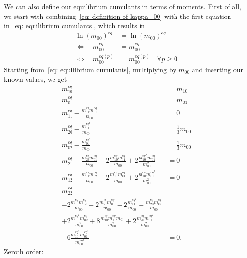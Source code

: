 We can also define our equilibrium cumulants in terms of moments.
First of all, we start with combining~\eqref{eq: definition of kappa_00} with the first equation in~\eqref{eq: equilibrium cumulants}, which results in
\begin{equation}
  \begin{aligned}
    {\ln(m_{00})}^{eq} &= {\ln(m_{00})}^{eq} \\
    \Leftrightarrow\quad m_{00}^{eq} &= m_{00}^{eq} \\
    \Leftrightarrow\quad m_{00}^{eq(p)} &= m_{00}^{eq(p)} \quad\forall p\ge 0
  \end{aligned}
\end{equation}
Starting from~\eqref{eq: equilibrium cumulants}, multiplying by $m_{00}$ and inserting our known values, we get
\begin{equation}
  \begin{aligned}
    m_{10}^{eq} & = m_{10} \\
    m_{01}^{eq} & = m_{01} \\
    m_{11}^{eq} - \frac{m_{10}^{eq}m_{01}^{eq}}{m_{00}} & = 0 \\
    m_{20}^{eq} - \frac{m_{10}^{{eq}^2}}{m_{00}} & = \frac{1}{3} m_{00} \\
    m_{02}^{eq} - \frac{m_{01}^{{eq}^2}}{m_{00}} & = \frac{1}{3} m_{00} \\
    m_{21}^{eq} - \frac{m_{20}^{eq}m_{01}^{eq}}{m_{00}} - 2\frac{m_{10}^{eq}m_{11}^{eq}} {m_{00}} + 2\frac{m_{10}^{{eq}^2} m_{01}^{eq}}{m_{00}^2} & = 0 \\
    m_{12}^{eq} - \frac{m_{10}^{eq}m_{02}^{eq}}{m_{00}}
    - 2\frac{m_{11}^{eq}m_{01}^{eq}}{m_{00}} + 2\frac{m_{10}^{eq} m_{01}^{{eq}^2}}{m_{00}^2} & = 0 \\
    m_{22}^{eq} &\\
    - 2 \frac{m_{10}^{eq}m_{12}^{eq}}{m_{00}} - 2\frac{m_{21}^{eq}m_{01}^{eq}}{m_{00}}
    - 2 \frac{m_{11}^{{eq}^2}}{m_{00}} - \frac{m_{20}^{eq}m_{02}^{eq}}{m_{00}} &\\
    + 2 \frac{m_{10}^{{eq}^2} m_{02}^{eq}}{m_{00}^2} + 8 \frac{m_{10}^{eq}m_{11}^{eq}m_{01}} {m_{00}^2}
    + 2 \frac{m_{20}^{eq}m_{01}^{{eq}^2}}{m_{00}^2} &\\
    - 6 \frac{m_{10}^{{eq}^2} m_{01}^{{eq}^2}}{m_{00}^{{eq}^3}} & = 0.
  \end{aligned}
\end{equation}
Zeroth order:
